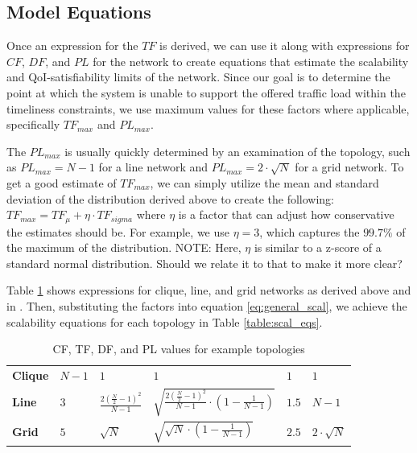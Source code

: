 \subsection{Model Equations}

Once an expression for the $TF$ is derived, we can use it along with expressions for $CF$, $DF$, and $PL$ for the network to create equations that estimate the scalability and QoI-satisfiability limits of the network.  Since our goal is to determine the point at which the system is unable to support the offered traffic load within the timeliness constraints, we use maximum values for these factors where applicable, specifically $TF_{max}$ and $PL_{max}$.  

The $PL_{max}$ is usually quickly determined by an examination of the topology, such as $PL_{max} = N-1$ for a line network and $PL_{max} = 2 \cdot \sqrt{N}$ for a grid network.  To get a good estimate of $TF_{max}$, we can simply utilize the mean and standard deviation of the distribution derived above to create the following: $TF_{max} = TF_{\mu} + \eta \cdot TF_{sigma}$ where $\eta$ is a factor that can adjust how conservative the estimates should be.  For example, we use $\eta = 3$, which captures the $99.7\%$ of the maximum of the distribution.  NOTE:  Here, $\eta$ is similar to a z-score of a standard normal distribution.  Should we relate it to that to make it more clear?

Table \ref{table:rf_ff_sf_values} shows expressions for clique, line, and grid networks as derived above and in \cite{symptotics_journal}.  Then, substituting the factors into equation \ref{eq:general_scal}, we achieve the scalability equations for each topology in Table \ref{table:scal_eqs}.  

\begin{table}[h]
\centering
\begin{tabular}{l|l|l|l|l|l|}
\cline{2-6}
                            					 & \boldmath{$CF$}  			& \boldmath{$TF_{\mu}$}   			& \boldmath{$TF_{\sigma}$}										& \boldmath{$DF$}			& \boldmath{$PL_{max}$}	\\ \hline
\multicolumn{1}{|l|}{\textbf{Clique}} 	& $N-1$ 						& $1$                            				& $1$                            												& $1$  						& $1$ 					\\ \hline
\multicolumn{1}{|l|}{\textbf{Line}}   	& $3$   							& $\frac{2(\frac{N}{2}-1)^2}{N-1}$ 	& $\sqrt{\frac{2(\frac{N}{2}-1)^2}{N-1} \cdot (1 - \frac{1}{N-1})}$ 		& $1.5$						& $N-1$				\\ \hline
\multicolumn{1}{|l|}{\textbf{Grid}}   	& $5$   							& $\sqrt{N}$                       			&$\sqrt{\sqrt{N} \cdot (1 - \frac{1}{N-1})}$							&  $2.5$					& $2 \cdot \sqrt{N}$   	\\ \hline
\end{tabular}
\caption{CF, TF, DF, and PL values for example topologies}
\label{table:rf_ff_sf_values}
\end{table}

